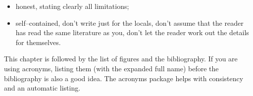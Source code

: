 \documentclass[a4paper,twoside, openright,12pt]{report}
\begin{document}
\begin{itemize}
	\item honest, stating clearly all limitations;
	\item self--contained, don't write just for the locals, don't assume that the reader has read the same literature as you, don't let the reader work out the details for themselves.
\end{itemize}



This chapter is followed by the list of figures and the bibliography. If you are using acronyms, listing them (with the expanded full name) before the bibliography is also a good idea. The acronyms package helps with consistency and an automatic listing.




\cleardoublepage
{} 
\listoffigures 	 %


\cleardoublepage
{}


\end{document}
